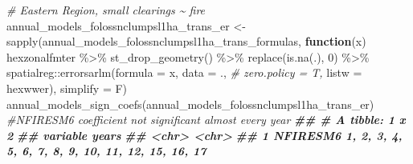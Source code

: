 \documentclass[10pt,landscape,a3paper]{article}
\newenvironment{Shaded}{\begin{snugshade}}{\end{snugshade}}
\newcommand{\AttributeTok}[1]{\textcolor[rgb]{0.77,0.63,0.00}{#1}}
\newcommand{\CommentTok}[1]{\textcolor[rgb]{0.56,0.35,0.01}{\textit{#1}}}
\newcommand{\ControlFlowTok}[1]{\textcolor[rgb]{0.13,0.29,0.53}{\textbf{#1}}}
\newcommand{\DecValTok}[1]{\textcolor[rgb]{0.00,0.00,0.81}{#1}}
\newcommand{\DocumentationTok}[1]{\textcolor[rgb]{0.56,0.35,0.01}{\textbf{\textit{#1}}}}
\newcommand{\FunctionTok}[1]{\textcolor[rgb]{0.00,0.00,0.00}{#1}}
\newcommand{\NormalTok}[1]{#1}
\newcommand{\OtherTok}[1]{\textcolor[rgb]{0.56,0.35,0.01}{#1}}
\newcommand{\SpecialCharTok}[1]{\textcolor[rgb]{0.00,0.00,0.00}{#1}}
\begin{document}
\begin{Shaded}
\begin{Highlighting}[]
\CommentTok{\# Eastern Region, small clearings \textasciitilde{} fire}
\NormalTok{annual\_models\_folossnclumpsl1ha\_trans\_er }\OtherTok{\textless{}{-}} \FunctionTok{sapply}\NormalTok{(annual\_models\_folossnclumpsl1ha\_trans\_formulas,}
                        \ControlFlowTok{function}\NormalTok{(x)}
\NormalTok{                          hexzonalfmter }\SpecialCharTok{\%\textgreater{}\%}
                          \FunctionTok{st\_drop\_geometry}\NormalTok{() }\SpecialCharTok{\%\textgreater{}\%}
                          \FunctionTok{replace}\NormalTok{(}\FunctionTok{is.na}\NormalTok{(.), }\DecValTok{0}\NormalTok{) }\SpecialCharTok{\%\textgreater{}\%}
\NormalTok{                          spatialreg}\SpecialCharTok{::}\FunctionTok{errorsarlm}\NormalTok{(}\AttributeTok{formula =}\NormalTok{ x,}
                                                 \AttributeTok{data =}\NormalTok{ ., }\CommentTok{\# zero.policy = T,}
                                                 \AttributeTok{listw =}\NormalTok{ hexwwer),}
                        \AttributeTok{simplify =}\NormalTok{ F)}
\FunctionTok{annual\_models\_sign\_coefs}\NormalTok{(annual\_models\_folossnclumpsl1ha\_trans\_er) }\CommentTok{\#NFIRESM6 coefficient not significant almost every year}
\DocumentationTok{\#\# \# A tibble: 1 x 2}
\DocumentationTok{\#\#   variable years                                            }
\DocumentationTok{\#\#   \textless{}chr\textgreater{}    \textless{}chr\textgreater{}                                            }
\DocumentationTok{\#\# 1 NFIRESM6 1, 2, 3, 4, 5, 6, 7, 8, 9, 10, 11, 12, 15, 16, 17}


\end{Highlighting}
\end{Shaded}
\end{document}
